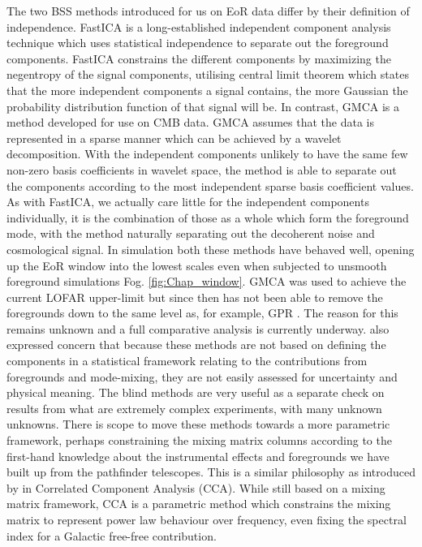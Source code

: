 The two BSS methods introduced for us on EoR data differ by their definition of independence. FastICA \cite{Chapman2012MNRAS.423.2518C,hyvarinen2004independent,hyvarinen1999fast} is a long-established independent component analysis technique which uses statistical independence to separate out the foreground components. FastICA constrains the different components by maximizing the negentropy of the signal components, utilising central limit theorem which states that the more independent components a signal contains, the more Gaussian the probability distribution function of that signal will be. In contrast, GMCA \cite{Bobin2016A&A...591A..50B,bobin2015sparsity,Chapman2013MNRAS.429..165C,Bobin2008StMet...5..307B} is a method developed for use on CMB data. GMCA assumes that the data is represented in a sparse manner which can be achieved by a wavelet decomposition. With the independent components unlikely to have the same few non-zero basis coefficients in wavelet space, the method is able to separate out the components according to the most independent sparse basis coefficient values. As with FastICA, we actually care little for the independent components individually, it is the combination of those as a whole which form the foreground mode, with the method naturally separating out the decoherent noise and cosmological signal. In simulation both these methods have behaved well, opening up the EoR window into the lowest scales even when subjected to unsmooth foreground simulations Fog. \ref{fig:Chap_window}. GMCA was used to achieve the current LOFAR upper-limit \citep{Patil2017ApJ...838...65P} but since then has not been able to remove the foregrounds down to the same level as, for example, GPR \citet{Mertens2018MNRAS.478.3640M}. The reason for this remains unknown and a full comparative analysis is currently underway. \citet{Mertens2018MNRAS.478.3640M} also expressed concern that because these methods are not based on defining the components in a statistical framework relating to the contributions from foregrounds and mode-mixing, they are not easily assessed for uncertainty and physical meaning. The blind methods are very useful as a separate check on results from what are extremely complex experiments, with many unknown unknowns. There is scope to move these methods towards a more parametric framework, perhaps constraining the mixing matrix columns according to the first-hand knowledge about the instrumental effects and foregrounds we have built up from the pathfinder telescopes. This is a similar philosophy as introduced by \citet{Bonaldi2015MNRAS.447.1973B} in Correlated Component Analysis (CCA). While still based on a mixing matrix framework, CCA is a parametric method which constrains the mixing matrix to represent power law behaviour over frequency, even fixing the spectral index for a Galactic free-free contribution. 

